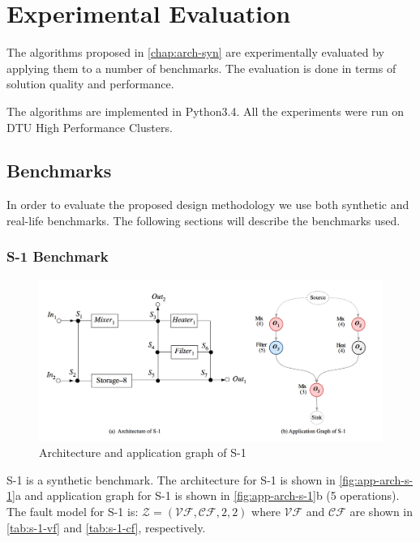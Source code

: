 \chapter{Experimental Evaluation}
\label{chap:exp-eval}
The algorithms proposed in \autoref{chap:arch-syn} are experimentally evaluated by applying them to a number of benchmarks. The evaluation is done in terms of solution quality and performance.

The algorithms are implemented in Python3.4. All the experiments were run on DTU High Performance Clusters.

\section{Benchmarks}
In order to evaluate the proposed design methodology we use both synthetic and real-life benchmarks. The following sections will describe the benchmarks used.

\subsection{S-1 Benchmark}
\label{sec:bench-s1}
\begin{figure}[H]
\centering
\includegraphics[scale=0.3]{figures/benchmark-s-1.png}
\caption[Architecture and application graph of S-1]{Architecture and application graph of S-1}
\label{fig:app-arch-s-1}
\end{figure}

S-1 is a synthetic benchmark. The architecture for S-1 is shown in \autoref{fig:app-arch-s-1}a and application graph for S-1 is shown in \autoref{fig:app-arch-s-1}b (5 operations).\\
The fault model for S-1 is: $\mathcal{Z} = (\mathcal{VF}, \mathcal{CF}, 2, 2)$ where $\mathcal{VF}$ and $\mathcal{CF}$ are shown in \autoref{tab:s-1-vf} and \autoref{tab:s-1-cf}, respectively.

